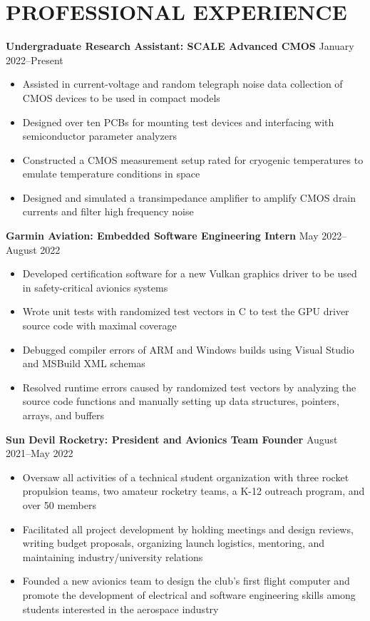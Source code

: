 \documentclass{article}
\begin{document}
\section{PROFESSIONAL EXPERIENCE}
\textbf{Undergraduate Research Assistant: SCALE Advanced CMOS}
\hfill
\vspace{0.5em}
January 2022--Present
\begin{itemize}
\item{Assisted in current-voltage and random telegraph noise data collection of CMOS devices to be used in compact models}
\item{Designed over ten PCBs for mounting test devices and interfacing with semiconductor parameter analyzers}
\item{Constructed a CMOS measurement setup rated for cryogenic temperatures to emulate temperature conditions in space}
\item{Designed and simulated a transimpedance amplifier to amplify CMOS drain currents and filter high frequency noise}
\end{itemize}
\vspace{1em}
\textbf{Garmin Aviation: Embedded Software Engineering Intern}
\hfill
\vspace{0.5em}
May 2022--August 2022
\begin{itemize}
\item{Developed certification software for a new Vulkan graphics driver to be used in safety-critical avionics systems}
\item{Wrote unit tests with randomized test vectors in C to test the GPU driver source code with maximal coverage}
\item{Debugged compiler errors of ARM and Windows builds using Visual Studio and MSBuild XML schemas}
\item{Resolved runtime errors caused by randomized test vectors by analyzing the source code functions and manually setting up data structures, pointers, arrays, and buffers}
\end{itemize}
\vspace{1em}
\textbf{Sun Devil Rocketry: President and Avionics Team Founder}
\hfill
\vspace{0.5em}
August 2021--May 2022
\begin{itemize}
\item{Oversaw all activities of a technical student organization with three rocket propulsion teams, two amateur rocketry teams, a K-12 outreach program, and over 50 members   }
\item{Facilitated all project development by holding meetings and design reviews, writing budget proposals, organizing launch logistics, mentoring, and maintaining industry/university relations}
\item{Founded a new avionics team to design the club's first flight computer and promote the development of electrical and software engineering skills among students interested in the aerospace industry}
\vspace{1em}
\end{itemize}
\end{document}
